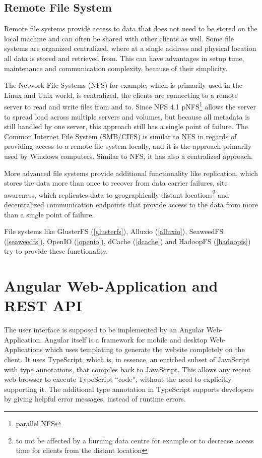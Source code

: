 \subsection{Remote File System}
\label{analysis:storage:organisation}

Remote file systems provide access to data that does not need to be stored on the local machine and can often be shared with other clients as well.
Some file systems are organized centralized, where at a single address and physical location all data is stored and retrieved from.
This can have advantages in setup time, maintenance and communication complexity, because of their simplicity.

The Network File Systems (NFS) for example, which is primarily used in the Linux and Unix world, is centralized, the clients are connecting to a remote server to read and write files from and to.
Since NFS 4.1 pNFS\footnote{parallel NFS}\cite[p. 14, section 1.7.2.2]{nfs:pnfs} allows the server to spread load across multiple servers and volumes, but because all metadata is still handled by one server, this approach still has a single point of failure.
The Common Internet File System (SMB/CIFS) is similar to NFS in regards of providing access to a remote file system locally, and it is the approach primarily used by Windows computers.
Similar to NFS, it has also a centralized approach.


More advanced file systems provide additional functionality like replication, which stores the data more than once to recover from data carrier failures, site awareness, which replicates data to geographically distant locations\footnote{to not be affected by a burning data centre for example or to decrease access time for clients from the distant location} and decentralized communication endpoints that provide access to the data from more than a single point of failure.


File systems like GlusterFS (\autoref{glusterfs}), Alluxio (\autoref{alluxio}), SeaweedFS (\autoref{seaweedfs}), OpenIO (\autoref{openio}), dCache (\autoref{dcache}) and HadoopFS (\autoref{hadoopfs}) try to provide these functionality.

\section{Angular Web-Application and REST API}
\label{fundamental:angular}

The user interface is supposed to be implemented by an Angular Web-Application.
Angular\cite{angular} itself is a framework for mobile and desktop Web-Applications which uses templating to generate the website completely on the client.
It uses TypeScript\cite{typescript}, which is, in essence, an enriched subset of JavaScript with type annotations, that compiles back to JavaScript.
This allows any recent web-browser to execute TypeScript \enquote{code}, without the need to explicitly supporting it.
The additional type annotation in TypeScript supports developers by giving helpful error messages, instead of runtime errors.

